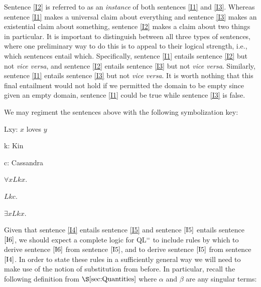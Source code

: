 Sentence \ref{I2} is referred to as an \textit{instance} of both sentences \ref{I1} and \ref{I3}. %
Whereas sentence \ref{I1} makes a universal claim about everything and sentence \ref{I3} makes an existential claim about something, sentence \ref{I2} makes a claim about two things in particular.
It is important to distinguish between all three types of sentences, where one preliminary way to do this is to appeal to their logical strength, i.e., which sentences entail which.
Specifically, sentence \ref{I1} entails sentence \ref{I2} but not \textit{vice versa}, and sentence \ref{I2} entails sentence \ref{I3} but not \textit{vice versa}.
Similarly, sentence \ref{I1} entails sentence \ref{I3} but not \textit{vice versa}.
It is worth nothing that this final entailment would not hold if we permitted the domain to be empty since given an empty domain, sentence \ref{I1} could be true while sentence \ref{I3} is false.


We may regiment the sentences above with the following symbolization key:

\begin{multicols}{2}
  
\begin{ekey}
  \item[Lxy:] $x$ loves $y$ 
  \item[k:] Kin
  \item[c:] Cassandra
\end{ekey}

\begin{earg}
  \item[\ex{I4}] $\forall xLkx$.
  \item[\ex{I5}] $Lkc$.
  \item[\ex{I6}] $\exists xLkx$.
\end{earg}

\end{multicols}

Given that sentence \ref{I4} entails sentence \ref{I5} and sentence $\ref{I5}$ entails sentence $\ref{I6}$, we should expect a complete logic for QL$^=$ to include rules by which to derive sentence $\ref{I6}$ from sentence $\ref{I5}$, and to derive sentence $\ref{I5}$ from sentence $\ref{I4}$. 
In order to state these rules in a sufficiently general way we will need to make use of the notion of substitution from before.
In particular, recall the following definition from $\S\ref{sec:Quantities}$ where $\alpha$ and $\beta$ are any singular terms:

